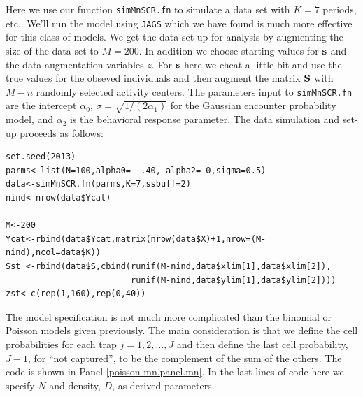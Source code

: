 Here we use our function \mbox{\tt simMnSCR.fn} to simulate a data set
with $K=7$ periods, etc.. We'll run the model using \mbox{\tt JAGS} which
we have found is much more effective for this class of models.  We get
the data set-up for analysis by augmenting the size of the data set to
$M=200$. In addition we choose starting values for ${\bf s}$ and the
data augmentation variables $z$.  For ${\bf s}$ here we cheat a little
bit and use the true values for the obseved individuals and then
augment the matrix ${\bf S}$ with $M-n$ randomly selected activity
centers.  The parameters input to \mbox{\tt simMnSCR.fn} are the
intercept $\alpha_{0}$, $\sigma = \sqrt{1/(2\alpha_{1})}$ for the
Gaussian encounter probability model, and $\alpha_{2}$ is the
behavioral response parameter. The data simulation and set-up proceeds
as follows:

{\small
\begin{verbatim}
set.seed(2013)
parms<-list(N=100,alpha0= -.40, alpha2= 0,sigma=0.5)
data<-simMnSCR.fn(parms,K=7,ssbuff=2)
nind<-nrow(data$Ycat)

M<-200
Ycat<-rbind(data$Ycat,matrix(nrow(data$X)+1,nrow=(M-nind),ncol=data$K))
Sst <-rbind(data$S,cbind(runif(M-nind,data$xlim[1],data$xlim[2]),
                         runif(M-nind,data$ylim[1],data$ylim[2])))
zst<-c(rep(1,160),rep(0,40))
\end{verbatim}
}

The model specification is not much more complicated than the binomial
or Poisson models given previously. The main consideration is that we
define the cell probabilities for each trap $j=1,2,\dots,J$ and then
define the last cell probability, $J+1$, for ``not captured'', to be
the complement of the sum of the others. The code is shown in Panel
\ref{poisson-mn.panel.mn}.  In the last lines of code here we specify
$N$ and density, $D$, as derived parameters.

